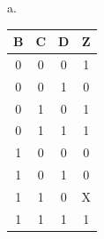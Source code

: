 \documentclass{article}
\begin{document}
a. 
    \begin{table}[!h]
    \centering
\begin{tabular}{|c|c|c|c|}
\hline
\textbf{B} & \textbf{C} & \textbf{D} & \textbf{Z} \\ \hline 
0          & 0          & 0          & 1          \\ \hline 
0          & 0          & 1          & 0          \\ \hline 
0          & 1          & 0          & 1          \\ \hline 
0          & 1          & 1          & 1          \\ \hline 
1          & 0          & 0          & 0          \\ \hline 
1          & 0          & 1          & 0          \\ \hline 
1          & 1          & 0          & X          \\ \hline 
1          & 1          & 1          & 1          \\ \hline
\end{tabular}
\end{table} \\
    
\end{document}
